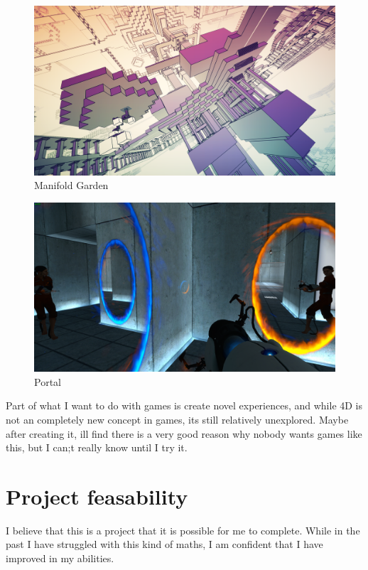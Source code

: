 \documentclass[12pt]{article}
\begin{document}
\begin{figure}
    \centering
    \includegraphics[width=\textwidth]{Media/ManifoldGarden.png}
    \caption{Manifold Garden}
\end{figure}
\begin{figure}
    \centering
    \includegraphics[width=\textwidth]{Media/Portal.png}
    \caption{Portal}
\end{figure}

Part of what I want to do with games is create novel experiences, and while 4D is not an completely new concept in games, its still relatively unexplored.
Maybe after creating it, ill find there is a very good reason why nobody wants games like this, but I can;t really know until I try it.

\section{Project feasability}
I believe that this is a project that it is possible for me to complete. While in the past I have struggled with this kind of maths, I am confident that I have improved in my abilities.
\end{document}
